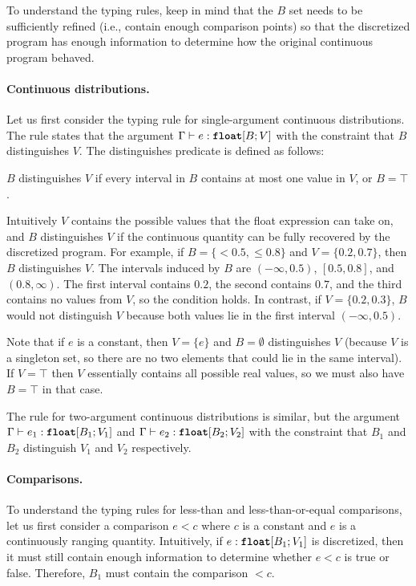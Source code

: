 To understand the typing rules, keep in mind that the $B$ set needs to be sufficiently refined (i.e., contain enough comparison points) so that the discretized program has enough information to determine how the original continuous program behaved.

\paragraph{Continuous distributions.} Let us first consider the typing rule for single-argument continuous distributions.
The rule states that the argument $\Gamma \vdash e : \text{\ttfamily\bfseries float}[B; V]$ with the constraint that $B$ distinguishes $V$. The distinguishes predicate is defined as follows:
\begin{definition}
    \label{def:distinguishes}
    $B$ distinguishes $V$ if every interval in $B$ contains at most one value in $V$, or $B = \top$.
\end{definition}
Intuitively $V$ contains the possible values that the float expression can take on, and $B$ distinguishes $V$ if the continuous quantity can be fully recovered by the discretized program.
For example, if $B = \{<\!\!0.5, \leq\!\!0.8\}$ and $V = \{0.2, 0.7\}$, then $B$ distinguishes $V$. The intervals induced by $B$ are $(-\infty, 0.5)$, $[0.5, 0.8]$, and $(0.8, \infty)$. The first interval contains $0.2$, the second contains $0.7$, and the third contains no values from $V$, so the condition holds. In contrast, if $V = \{0.2, 0.3\}$, $B$ would not distinguish $V$ because both values lie in the first interval $(-\infty, 0.5)$.

Note that if $e$ is a constant, then $V = \{e\}$ and $B = \emptyset$ distinguishes $V$ (because $V$ is a singleton set, so there are no two elements that could lie in the same interval).
If $V = \top$ then $V$ essentially contains all possible real values, so we must also have $B = \top$ in that case.

The rule for two-argument continuous distributions is similar, but the argument $\Gamma \vdash e_1 : \text{\ttfamily\bfseries float}[B_1; V_1]$ and $\Gamma \vdash e_2 : \text{\ttfamily\bfseries float}[B_2; V_2]$ with the constraint that $B_1$ and $B_2$ distinguish $V_1$ and $V_2$ respectively.



\paragraph{Comparisons.} 
To understand the typing rules for less-than and less-than-or-equal comparisons, let us first consider a comparison $e < c$ where $c$ is a constant and $e$ is a continuously ranging quantity. Intuitively, if $e : \text{\ttfamily\bfseries float}[B_1; V_1]$ is discretized, then it must still contain enough information to determine whether $e < c$ is true or false. Therefore, $B_1$ must contain the comparison $<\!\!c$.

